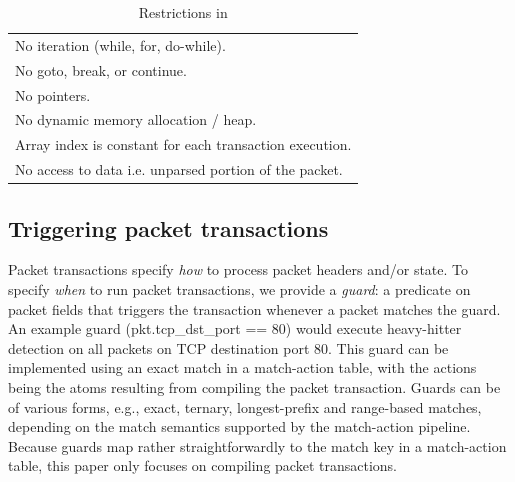\begin{table}
  \begin{tabular}{p{}}
    No iteration (while, for, do-while).\\
    No goto, break, or continue.\\
    No pointers.\\
    No dynamic memory allocation / heap.\\
    Array index is constant for each transaction execution.\\
    No access to data i.e. unparsed portion of the packet.\\
  \end{tabular}


  \caption{Restrictions in \pktlanguage}

  \label{tab:restrict}
\end{table}

\subsection{Triggering packet transactions}
\label{ss:guards}
Packet transactions specify \textit{how} to process packet headers and/or
state.  To specify {\em when} to run packet transactions, we provide a {\em
guard}: a predicate on packet fields that triggers the transaction whenever a
packet matches the guard. An example guard (pkt.tcp\_dst\_port == 80) would execute
heavy-hitter detection on all packets on TCP destination port 80. This guard can
be implemented using an exact match in a match-action table, with the actions
being the atoms resulting from compiling the packet transaction. Guards can be of various forms,
e.g., exact, ternary, longest-prefix and range-based matches, depending on the
match semantics supported by the match-action pipeline. Because guards map
rather straightforwardly to the match key in a match-action table, this paper only
focuses on compiling packet transactions.


